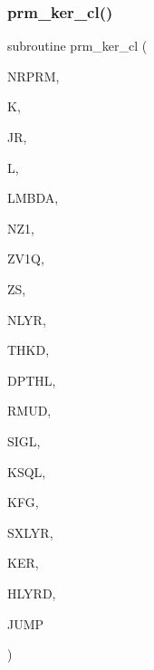 \subsubsection{\texorpdfstring{prm\+\_\+ker\+\_\+cl()}{prm\_ker\_cl()}}
{\footnotesize\ttfamily subroutine prm\+\_\+ker\+\_\+cl (\begin{DoxyParamCaption}\item[{integer}]{N\+R\+P\+RM,  }\item[{integer}]{K,  }\item[{integer}]{JR,  }\item[{integer}]{L,  }\item[{real(kind=ql)}]{L\+M\+B\+DA,  }\item[{integer}]{N\+Z1,  }\item[{real(kind=ql), dimension(nz1)}]{Z\+V1Q,  }\item[{real(kind=ql)}]{ZS,  }\item[{integer}]{N\+L\+YR,  }\item[{real(kind=ql), dimension (nlyr)}]{T\+H\+KD,  }\item[{real(kind=ql), dimension (nlyr)}]{D\+P\+T\+HL,  }\item[{real(kind=ql), dimension(0\+:nlyr)}]{R\+M\+UD,  }\item[{complex(kind=ql), dimension (nlyr)}]{S\+I\+GL,  }\item[{complex(kind=ql), dimension (nlyr)}]{K\+S\+QL,  }\item[{integer}]{K\+FG,  }\item[{integer}]{S\+X\+L\+YR,  }\item[{complex (kind=ql), dimension(jnlo-\/nrprm\+:jnhi,3,nz1)}]{K\+ER,  }\item[{complex (kind=ql), dimension(nrprm,3,nz1)}]{H\+L\+Y\+RD,  }\item[{logical}]{J\+U\+MP }\end{DoxyParamCaption})}

